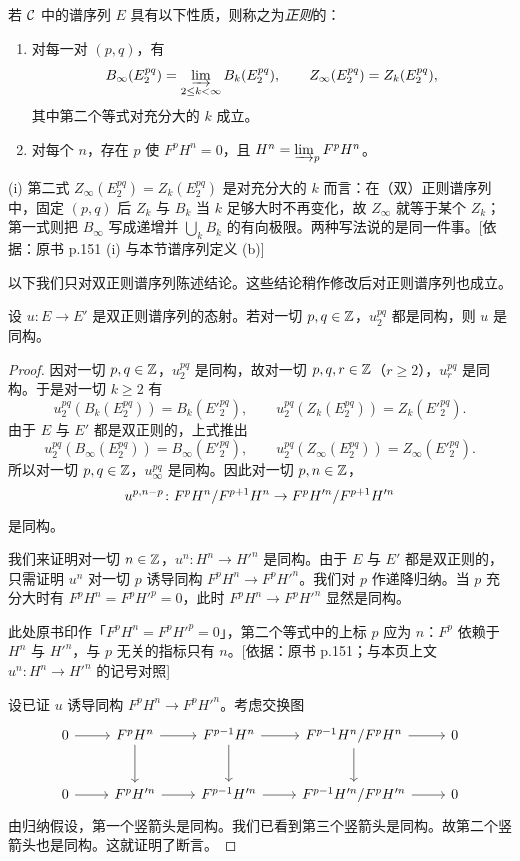 若 $\mathcal{C}$ 中的谱序列 $E$ 具有以下性质，则称之为\emph{正则}的：
\begin{enumerate}[label=(\roman*),leftmargin=2.8em]
  \item 对每一对 $(p,q)$，有
  \[
  B_\infty(E_2^{pq})=\varinjlim_{2\le k<\infty}B_k(E_2^{pq}),\qquad Z_\infty(E_2^{pq})=Z_k(E_2^{pq}),
  \]
  其中第二个等式对充分大的 $k$ 成立。
  \item 对每个 $n$，存在 $p$ 使 $F^pH^n=0$，且 $H^n=\varinjlim_pF^pH^n$。
\end{enumerate}
\begin{tnote}
(i) 第二式 $Z_\infty(E_2^{pq})=Z_k(E_2^{pq})$ 是对充分大的 $k$ 而言：在（双）正则谱序列中，固定 $(p,q)$ 后 $Z_k$ 与 $B_k$ 当 $k$ 足够大时不再变化，故 $Z_\infty$ 就等于某个 $Z_k$；第一式则把 $B_\infty$ 写成递增并 $\bigcup_kB_k$ 的有向极限。两种写法说的是同一件事。[依据：原书 p.151 (i) 与本节谱序列定义 (b)]
\end{tnote}

以下我们只对双正则谱序列陈述结论。这些结论稍作修改后对正则谱序列也成立。

\begin{proposition}\label{it:2.2.1}
设 $u\colon E\to E'$ 是双正则谱序列的态射。若对一切 $p,q\in\mathbb{Z}$，$u_2^{pq}$ 都是同构，则 $u$ 是同构。
\end{proposition}
\begin{proof}
因对一切 $p,q\in\mathbb{Z}$，$u_2^{pq}$ 是同构，故对一切 $p,q,r\in\mathbb{Z}$（$r\ge 2$），$u_r^{pq}$ 是同构。于是对一切 $k\ge 2$ 有
\[
u_2^{pq}(B_k(E_2^{pq}))=B_k(E'^{pq}_2),\qquad u_2^{pq}(Z_k(E_2^{pq}))=Z_k(E'^{pq}_2).
\]
由于 $E$ 与 $E'$ 都是双正则的，上式推出
\[
u_2^{pq}(B_\infty(E_2^{pq}))=B_\infty(E'^{pq}_2),\qquad u_2^{pq}(Z_\infty(E_2^{pq}))=Z_\infty(E'^{pq}_2).
\]
所以对一切 $p,q\in\mathbb{Z}$，$u_\infty^{pq}$ 是同构。因此对一切 $p,n\in\mathbb{Z}$，
\[
u^{p,n-p}\colon F^pH^n/F^{p+1}H^n\to F^pH'^n/F^{p+1}H'^n
\]
是同构。

我们来证明对一切 $n\in\mathbb{Z}$，$u^n\colon H^n\to H'^n$ 是同构。由于 $E$ 与 $E'$ 都是双正则的，只需证明 $u^n$ 对一切 $p$ 诱导同构 $F^pH^n\to F^pH'^n$。我们对 $p$ 作递降归纳。当 $p$ 充分大时有 $F^pH^n=F^pH'^p=0$，此时 $F^pH^n\to F^pH'^n$ 显然是同构。
\begin{tnote}
此处原书印作「$F^pH^n=F^pH'^p=0$」，第二个等式中的上标 $p$ 应为 $n$：$F^p$ 依赖于 $H^n$ 与 $H'^n$，与 $p$ 无关的指标只有 $n$。[依据：原书 p.151；与本页上文 $u^n\colon H^n\to H'^n$ 的记号对照]
\end{tnote}
设已证 $u$ 诱导同构 $F^pH^n\to F^pH'^n$。考虑交换图
\[\begin{tikzcd}[column sep=2.4em,row sep=2.4em]
0 \arrow[r] & F^pH^n \arrow[r] \arrow[d] & F^{p-1}H^n \arrow[r] \arrow[d] & F^{p-1}H^n/F^pH^n \arrow[r] \arrow[d] & 0 \\
0 \arrow[r] & F^pH'^n \arrow[r] & F^{p-1}H'^n \arrow[r] & F^{p-1}H'^n/F^pH'^n \arrow[r] & 0
\end{tikzcd}\]
由归纳假设，第一个竖箭头是同构。我们已看到第三个竖箭头是同构。故第二个竖箭头也是同构。这就证明了断言。
\end{proof}

